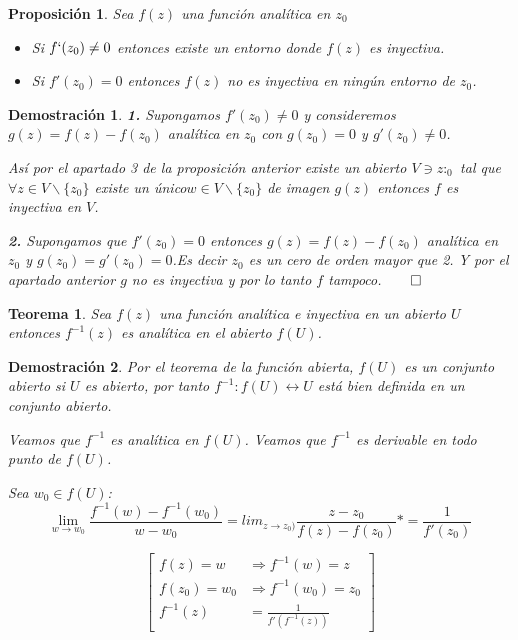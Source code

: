 \documentclass[10pt]{book}
\newtheorem{theorem}{Teorema}[chapter]
\newtheorem{prop}{Proposición}[chapter]
\newtheorem*{dem}{Demostración}
\begin{document}
\begin{prop}
Sea $f(z)$ una función analítica en $z_0$
\begin{itemize}
\item Si $f`(z_0) \neq 0$ entonces existe un entorno donde $f(z)$ es inyectiva.
\item Si $f'(z_0)=0$ entonces $f(z)$ no es inyectiva en ningún entorno de $z_0$.
\end{itemize}
\end{prop}

\begin{dem}
\textbf{1.} Supongamos $f'(z_0)\neq 0$ y consideremos $g(z) = f(z)-f(z_0)$ analítica en $z_0$ con  $g(z_0) = 0$ y $g'(z_0) \neq 0$.

Así por el apartado 3 de la proposición anterior existe un abierto $V\ni z:_0$ tal que $\forall z\in V\backslash\{z_0\}$ existe un único$w \in V\backslash\{z_0\}$ de imagen $g(z)$ entonces $f$ es inyectiva en $V$.

\textbf{2.} Supongamos que $f'(z_0)=0$ entonces $g(z) = f(z)-f(z_0)$ analítica en $z_0$ y $g(z_0)= g'(z_0) = 0$.Es decir $z_0$ es un cero de orden mayor que 2. Y por el apartado anterior $g$ no es inyectiva y por lo tanto $f$ tampoco.$\qed$

\end{dem}


\begin{theorem}
Sea $f(z)$ una función analítica e inyectiva en un abierto $U$ entonces $f^{-1}(z)$ es analítica en el abierto $f(U)$.
\end{theorem}

\begin{dem}
Por el teorema de la función abierta, $f(U)$ es un conjunto abierto si $U$ es abierto, por tanto $f^{-1}: f(U)\longleftrightarrow U$ está bien definida en un conjunto abierto.

Veamos que $f^{-1}$ es analítica en $f(U)$. Veamos que $f^{-1}$ es derivable en todo punto de $f(U)$.

Sea $w_0\in f(U)$:
$$
\lim_{w\to w_0}\frac{f^{-1}(w) - f^{-1}(w_0)}{w-w_0} = lim_{z\to z_0)} \frac{z-z_0}{f(z)-f(z_0)} *= \frac{1}{f'(z_0)}
$$

$$\left[\begin{array}{ll}
f(z) = w &\Rightarrow f^{-1}(w) = z\\
 f(z_0) = w_0 &\Rightarrow f^{-1}(w_0) = z_0\\
 f^{-1}(z) &= \frac{1}{f'(f^{-1}(z))}
\end{array}\right]$$
\end{dem}
\end{document}
